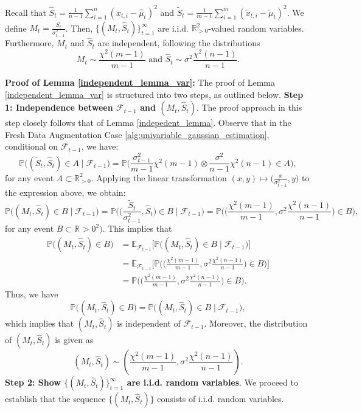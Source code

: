 \begin{lemma}
\label{independent_lemma_var}
Recall that $\widehat{S}_t =  \frac{1}{n-1}\sum_{i=1}^n (x_{t,i}-\widehat{\mu}_t)^2$ and $\widetilde{S}_t =  \frac{1}{m-1}\sum_{i=1}^m (\widetilde{x}_{t,i}-\widetilde{\mu}_t)^2$. We define $M_t = \frac{\widetilde{S}_t}{\sigma_{t-1}^2}$. Then, \(\{(M_t, \widehat{S}_t)\}_{t=1}^{\infty}\) are i.i.d. \(\mathbb{R}^2_{>0}\)-valued random variables. Furthermore, \(M_t\) and \(\widehat{S}_t\) are independent, following the distributions
\[
M_t \sim \frac{\chi^2(m-1)}{m-1} \mbox{ and } \widehat{S}_t \sim \sigma^2 \frac{\chi^2(n-1)}{n-1}.
\]
\end{lemma}
\noindent
\textbf{Proof of Lemma \ref{independent_lemma_var}:} 
The proof of Lemma \ref{independent_lemma_var} is structured into two steps, as outlined below.
\noindent
\textbf{Step 1: Independence between $\mathcal{F}_{t-1}$ and $(M_t,\widehat{S}_t)$}.
The proof approach in this step closely follows that of Lemma \ref{indepedent_lemma}. Observe that in the Fresh Data Augmentation Case \ref{alg:univariable_gaussian_estimation}, conditional on \(\mathcal{F}_{t-1}\), we have:
\[
\mathbb{P}\big((\widetilde{S}_t, \widehat{S}_t) \in A \mid \mathcal{F}_{t-1}\big) = \mathbb{P}\Bigg(  \frac{\sigma_{t-1}^2}{m-1}\chi^2(m-1) \otimes \frac{\sigma^2}{n-1}\chi^2(n-1) \in A \Bigg),
\]
for any event \(A \subset \mathbb{R}_{>0}^2\). Applying the linear transformation \((x, y) \mapsto \big(\frac{x}{\sigma_{t-1}^2}, {y}\big)\) to the expression above, we obtain:
\[
\mathbb{P}\big((M_t, \widehat{S}_t) \in B \mid \mathcal{F}_{t-1}\big) = \mathbb{P}\Bigg(\Big(\frac{\widetilde{S}_t}{\sigma_{t-1}^2}, {\widehat{S}_t}\Big) \in B \mid \mathcal{F}_{t-1}\Bigg) = \mathbb{P}\Bigg(\Big(\frac{\chi^2(m-1)}{m-1}, \sigma^2\frac{\chi^2(n-1)}{n-1}\Big) \in B \Bigg),
\]
for any event $B \subset \mathbb{R}_{}>0^2)$. This implies that
\begin{align*}
      \mathbb{P}\big((M_t, \widehat{S}_t) \in B\big) 
    &= \mathbb{E}_{\mathcal{F}_{t-1}}\Big[\mathbb{P}\big((M_t, \widehat{S}_t) \in B \mid \mathcal{F}_{t-1}\big)\Big] \\
    &= \mathbb{E}_{\mathcal{F}_{t-1}}\Big[\mathbb{P}\Big(\Big(\frac{\chi^2(m-1)}{m-1}, \sigma^2 \frac{\chi^2(n-1)}{n-1}\Big) \in B\Big)\Big] \\
    &= \mathbb{P}\Big(\Big(\frac{\chi^2(m-1)}{m-1}, \sigma^2\frac{\chi^2(n-1)}{n-1}\Big) \in B\Big).  
\end{align*}
Thus, we have
\[
\mathbb{P}\big((M_t, \widehat{S}_t) \in B\big) = \mathbb{P}\big((M_t, \widehat{S}_t) \in B \mid \mathcal{F}_{t-1}\big),
\]
which implies that \((M_t, \widehat{S}_t)\) is independent of \(\mathcal{F}_{t-1}\). Moreover, the distribution of $(M_t, \widehat{S}_t)$ is given as
\[
(M_t, \widehat{S}_t) \sim \left(\frac{\chi^2(m-1)}{m-1}, \sigma^2\frac{\chi^2(n-1)}{n-1}\right).
\]
\textbf{Step 2: Show $\{(M_t,\widehat{S}_t)\}_{t=1}^{\infty}$ are i.i.d. random variables}.
We proceed to establish that the sequence \(\{(M_t, \widehat{S}_t)\}\) consists of i.i.d. random variables. 

